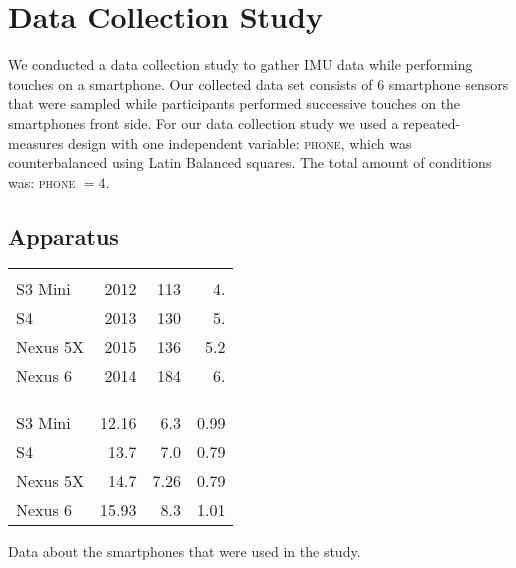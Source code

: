 \section{Data Collection Study}

We conducted a data collection study to gather IMU data while performing touches on a smartphone.
Our collected data set consists of 6 smartphone sensors that were sampled while participants performed successive touches on the smartphones front side. 
For our data collection study we used a repeated-measures design with one independent variable: \textsc{phone}, which was counterbalanced using Latin Balanced squares. 
The total amount of conditions was: \textsc{phone} $ = 4$.

\subsection{Apparatus}
\begin{margintable}
	\vspace{-3.9cm}
	\centering
	\begin{tabularx}{1.03\marginparwidth}{Xd{2.1}d{2.1}d{1.1}}
		\toprule
		&
		&    
		 &
		 \\
		\\
		\\
		\midrule
		S3 Mini  		& 2012 & 113 &  4. \\
		S4 				& 2013 & 130 &5.   \\
		Nexus 5X 		& 2015 & 136 &5.2  \\
		Nexus 6 		& 2014 & 184 & 6.  \\ 
		
		
		\bottomrule
		
		& &
		 &
		 \\ 
		\\
		\\
		\midrule
		S3 Mini  		& 12.16 & 6.3  & 0.99 \\
		S4 				& 13.7  & 7.0  & 0.79 \\
		Nexus 5X 		& 14.7  & 7.26 & 0.79 \\
		Nexus 6 		& 15.93 & 8.3  & 1.01 \\
		
		\bottomrule
	\end{tabularx}%
	\caption[Smartphone data]{\small Data about the smartphones that were used in the study.}
	\label{tab:devices}
\end{margintable}
